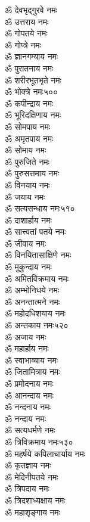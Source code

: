 \begin{multicols}{2}
\begin{flushleft}
ॐ देवभृद्गुरवे नमः\\
ॐ उत्तराय नमः\\
ॐ गोपतये नमः\\
ॐ गोप्त्रे नमः\\
ॐ ज्ञानगम्याय नमः\\
ॐ पुरातनाय नमः\\
ॐ शरीरभूतभृते नमः\\
ॐ भोक्त्रे नमः\hfill ५००\\
ॐ कपीन्द्राय नमः\\
ॐ भूरिदक्षिणाय नमः\\
ॐ सोमपाय नमः\\
ॐ अमृतपाय नमः\\
ॐ सोमाय नमः\\
ॐ पुरुजिते नमः\\
ॐ पुरुसत्तमाय नमः\\
ॐ विनयाय नमः\\
ॐ जयाय नमः\\
ॐ सत्यसन्धाय नमः\hfill ५१०\\
ॐ दाशार्हाय नमः\\
ॐ सात्त्वतां पतये नमः\\
ॐ जीवाय नमः\\
ॐ विनयितासाक्षिणे नमः\\
ॐ मुकुन्दाय नमः\\
ॐ अमितविक्रमाय नमः\\
ॐ अम्भोनिधये नमः\\
ॐ अनन्तात्मने नमः\\
ॐ महोदधिशयाय नमः\\
ॐ अन्तकाय नमः\hfill ५२०\\
ॐ अजाय नमः\\
ॐ महार्हाय नमः\\
ॐ स्वाभाव्याय नमः\\
ॐ जितामित्राय नमः\\
ॐ प्रमोदनाय नमः\\
ॐ आनन्दाय नमः\\
ॐ नन्दनाय नमः\\
ॐ नन्दाय नमः\\
ॐ सत्यधर्मणे नमः\\
ॐ त्रिविक्रमाय नमः\hfill ५३०\\
ॐ महर्षये कपिलाचार्याय नमः\\
ॐ कृतज्ञाय नमः\\
ॐ मेदिनीपतये नमः\\
ॐ त्रिपदाय नमः\\
ॐ त्रिदशाध्यक्षाय नमः\\
ॐ महाशृङ्गाय नमः\\

\end{flushleft}
\end{multicols}
